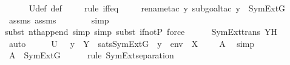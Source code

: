 \begin{isabellebody}
\ \ \ \ \isamarkupfalse%
\ U{\isacharunderscore}{\kern0pt}def\ {\isasympsi}{\isacharunderscore}{\kern0pt}def\isanewline
\ \ \ \ \isamarkupfalse%
{\isacharparenleft}{\kern0pt}rule\ iff{\isacharunderscore}{\kern0pt}eq{\isacharparenright}{\kern0pt}\isanewline
\ \ \ \ \isamarkupfalse%
{\isacharparenleft}{\kern0pt}rename{\isacharunderscore}{\kern0pt}tac\ y{\isacharcomma}{\kern0pt}\ subgoal{\isacharunderscore}{\kern0pt}tac\ {\isachardoublequoteopen}y\ {\isasymin}\ SymExt{\isacharparenleft}{\kern0pt}G{\isacharparenright}{\kern0pt}{\isachardoublequoteclose}{\isacharparenright}{\kern0pt}\isanewline
\ \ \ \ \isamarkupfalse%
\ assms\ assms{}\ \isanewline
\ \ \ \ \ \isamarkupfalse%
\ simp\ \isanewline
\ \ \ \ \ \isamarkupfalse%
{\isacharparenleft}{\kern0pt}subst\ nth{\isacharunderscore}{\kern0pt}append{\isacharcomma}{\kern0pt}\ simp{\isacharcomma}{\kern0pt}\ simp{\isacharcomma}{\kern0pt}\ subst\ if{\isacharunderscore}{\kern0pt}not{\isacharunderscore}{\kern0pt}P{\isacharcomma}{\kern0pt}\ force{\isacharparenright}{\kern0pt}\isanewline
\ \ \ \ \isamarkupfalse%
\ SymExt{\isacharunderscore}{\kern0pt}trans\ YH\ \isanewline
\ \ \ \ \isamarkupfalse%
\ auto\isanewline
\ \ \isamarkupfalse%
\ \isamarkupfalse%
\ {\isachardoublequoteopen}U\ {\isacharequal}{\kern0pt}\ {\isacharbraceleft}{\kern0pt}\ y\ {\isasymin}\ Y\ {\isachardot}{\kern0pt}\ sats{\isacharparenleft}{\kern0pt}SymExt{\isacharparenleft}{\kern0pt}G{\isacharparenright}{\kern0pt}{\isacharcomma}{\kern0pt}\ {\isasympsi}{\isacharcomma}{\kern0pt}\ {\isacharbrackleft}{\kern0pt}y{\isacharbrackright}{\kern0pt}\ {\isacharat}{\kern0pt}\ env\ {\isacharat}{\kern0pt}\ {\isacharbrackleft}{\kern0pt}X{\isacharbrackright}{\kern0pt}{\isacharparenright}{\kern0pt}\ {\isacharbraceright}{\kern0pt}{\isachardoublequoteclose}\ {\isacharparenleft}{\kern0pt}\ {\isachardoublequoteopen}{\isacharunderscore}{\kern0pt}\ {\isacharequal}{\kern0pt}\ {\isacharquery}{\kern0pt}A{\isachardoublequoteclose}{\isacharparenright}{\kern0pt}\ \isamarkupfalse%
\ simp\isanewline
\isanewline
\ \ \isamarkupfalse%
\ {\isachardoublequoteopen}{\isacharquery}{\kern0pt}A\ {\isasymin}\ SymExt{\isacharparenleft}{\kern0pt}G{\isacharparenright}{\kern0pt}{\isachardoublequoteclose}\ \isanewline
\ \ \ \ \isamarkupfalse%
{\isacharparenleft}{\kern0pt}rule\ SymExt{\isacharunderscore}{\kern0pt}separation{\isacharparenright}{\kern0pt}\isanewline

\end{isabellebody}
